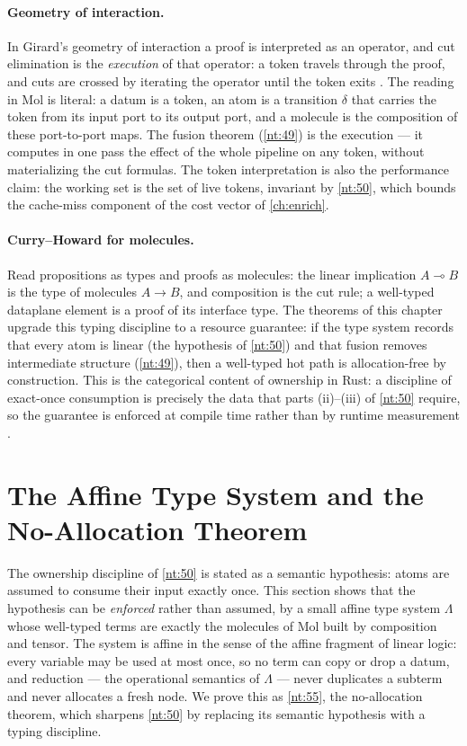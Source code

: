 \paragraph{Geometry of interaction.}
In Girard's geometry of interaction a proof is interpreted as an operator, and cut elimination is the \emph{execution} of that operator: a token travels through the proof, and cuts are crossed by iterating the operator until the token exits \citep{girard, arxiv-linear-logic-goi}. The reading in Mol is literal: a datum is a token, an atom is a transition $\delta$ that carries the token from its input port to its output port, and a molecule is the composition of these port-to-port maps. The fusion theorem (\autoref{nt:49}) is the execution --- it computes in one pass the effect of the whole pipeline on any token, without materializing the cut formulas. The token interpretation is also the performance claim: the working set is the set of live tokens, invariant by \autoref{nt:50}, which bounds the cache-miss component of the cost vector of \autoref{ch:enrich}.

\paragraph{Curry--Howard for molecules.}
Read propositions as types and proofs as molecules: the linear implication $A \multimap B$ is the type of molecules $A \to B$, and composition is the cut rule; a well-typed dataplane element is a proof of its interface type. The theorems of this chapter upgrade this typing discipline to a resource guarantee: if the type system records that every atom is linear (the hypothesis of \autoref{nt:50}) and that fusion removes intermediate structure (\autoref{nt:49}), then a well-typed hot path is allocation-free by construction. This is the categorical content of ownership in Rust: a discipline of exact-once consumption is precisely the data that parts (ii)--(iii) of \autoref{nt:50} require, so the guarantee is enforced at compile time rather than by runtime measurement \citep{wadler}.

\section{The Affine Type System and the No-Allocation Theorem}\label{sec:linear-affine}

The ownership discipline of \autoref{nt:50} is stated as a semantic hypothesis: atoms are assumed to consume their input exactly once. This section shows that the hypothesis can be \emph{enforced} rather than assumed, by a small affine type system $\Lambda$ whose well-typed terms are exactly the molecules of Mol built by composition and tensor. The system is affine in the sense of the affine fragment of linear logic: every variable may be used at most once, so no term can copy or drop a datum, and reduction --- the operational semantics of $\Lambda$ --- never duplicates a subterm and never allocates a fresh node. We prove this as \autoref{nt:55}, the no-allocation theorem, which sharpens \autoref{nt:50} by replacing its semantic hypothesis with a typing discipline.

